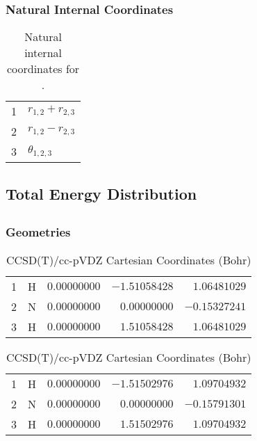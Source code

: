 \documentclass[10pt,oneside]{article}
\begin{document}
\begin{table}[h!]
\subsubsection*{Natural Internal Coordinates}
\centering
\caption{Natural internal coordinates for .}
\small
\begin{tabular}{ll}
\toprule
  1   & $r_{1,2} + r_{2,3}$ \\
  2   & $r_{1,2} - r_{2,3}$ \\
  3   & $\theta_{1,2,3}$ \\
\bottomrule
\end{tabular}
\end{table}

\begin{table}
\subsection*{Total Energy Distribution}
\centering\end{table}

\clearpage

\subsection{}

\begin{table}[h!]
\subsubsection*{Geometries}
\begin{multicols}{2}
\centering
\caption{CCSD(T)/cc-pVTZ Cartesian Coordinates (Bohr)}
\begin{tabular}{llrrr}
\toprule
1  & H  & $ 0.00000000$ & $-1.51058428$ & $ 1.06481029$ \\
2  & N  & $ 0.00000000$ & $ 0.00000000$ & $-0.15327241$ \\
3  & H  & $ 0.00000000$ & $ 1.51058428$ & $ 1.06481029$ \\
\bottomrule
\end{tabular}
\caption{CCSD(T)/cc-pVDZ Cartesian Coordinates (Bohr)}
\begin{tabular}{llrrr}
\toprule
1  & H  & $ 0.00000000$ & $-1.51502976$ & $ 1.09704932$ \\
2  & N  & $ 0.00000000$ & $ 0.00000000$ & $-0.15791301$ \\
3  & H  & $ 0.00000000$ & $ 1.51502976$ & $ 1.09704932$ \\
\bottomrule
\end{tabular}
\end{multicols}
\end{table}
\end{document}
